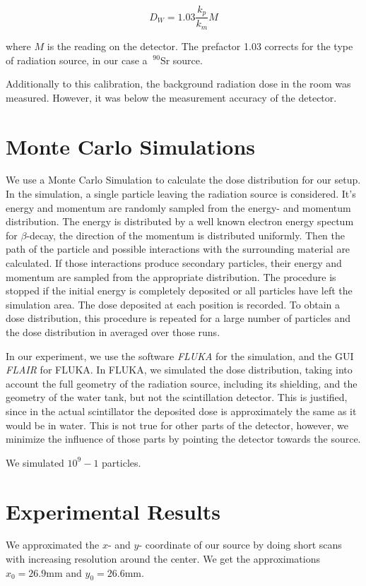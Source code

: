 \documentclass[a4paper,parskip]{scrartcl}
\begin{document}
$$D_W = 1.03\frac{k_p}{k_m}M$$

where $M$ is the reading on the detector. The prefactor 1.03 corrects for the type of radiation source, in our case a $~^{90}$Sr source.

Additionally to this calibration, the background radiation dose in the room was measured. However, it was below the measurement accuracy of the detector.

\section{Monte Carlo Simulations}
We use a Monte Carlo Simulation to calculate the dose distribution for our setup. In the simulation, a single particle leaving the radiation source is considered. It's energy and momentum are randomly sampled from the energy- and momentum distribution. The energy is distributed by a well known electron energy spectum for $\beta$-decay, the direction of the momentum is distributed uniformly. Then the path of the particle and possible interactions with the surrounding material are calculated. If those interactions produce secondary particles, their energy and momentum are sampled from the appropriate distribution. The procedure is stopped if the initial energy is completely deposited or all particles have left the simulation area. The dose deposited at each position is recorded. To obtain a dose distribution, this procedure is repeated for a large number of particles and the dose distribution in averaged over those runs.

In our experiment, we use the software \textit{FLUKA} for the simulation, and the GUI \textit{FLAIR} for FLUKA. In FLUKA, we simulated the dose distribution, taking into account the full geometry of the radiation source, including its shielding, and the geometry of the water tank, but not the scintillation detector. This is justified, since in the actual scintillator the deposited dose is approximately the same as it would be in water. This is not true for other parts of the detector, however, we minimize the influence of those parts by pointing the detector towards the source.

We simulated $10^9-1$ particles. 


\section{Experimental Results}

We approximated the $x$- and $y$- coordinate of our source by doing short scans with increasing resolution around the center. We get the approximations $x_0 = 26.9 \mathrm{mm}$ and $y_0 = 26.6 \mathrm{mm}$.
\end{document}

